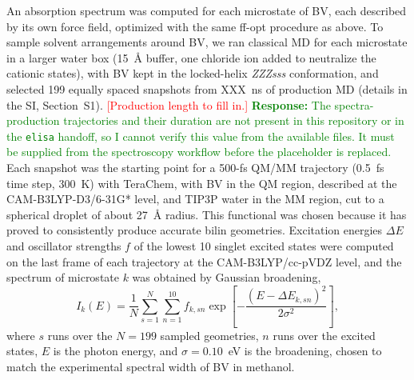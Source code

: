 An absorption spectrum was computed for each microstate of BV, each described by its own force field, optimized with the same ff-opt procedure as above.\cite{curtisRobustAutomatedForce2026}
To sample solvent arrangements around BV, we ran classical MD for each microstate in a larger water box (15~\AA{} buffer, one chloride ion added to neutralize the cationic states), with BV kept in the locked-helix \textit{ZZZsss} conformation,\cite{tongManyRoadsSeam2026} and selected 199 equally spaced snapshots from XXX~ns of production MD (details in the SI, Section~S1). \textcolor{red}{[Production length to fill in.]}
\textcolor{green}{\textbf{Response:} The spectra-production trajectories and their duration are not present in this repository or in the \texttt{elisa} handoff, so I cannot verify this value from the available files. It must be supplied from the spectroscopy workflow before the placeholder is replaced.}
Each snapshot was the starting point for a 500-fs QM/MM trajectory (0.5~fs time step, 300~K) with TeraChem,\cite{ufimtsevQuantumChemistryGraphical2008,ufimtsevQuantumChemistryGraphical2009,ufimtsevQuantumChemistryGraphical2009a} with BV in the QM region, described at the CAM-B3LYP\cite{yanai_new_2004}-D3\cite{grimme_consistent_2010}/6-31G* level, and TIP3P water in the MM region, cut to a spherical droplet of about 27~\AA{} radius.
This functional was chosen because it has proved to consistently produce accurate bilin geometries.\cite{wiebeler_qmmm_2019}
Excitation energies $\Delta E$ and oscillator strengths $f$ of the lowest 10 singlet excited states were computed on the last frame of each trajectory at the CAM-B3LYP/cc-pVDZ level,\cite{wiebeler_qmmm_2019} and the spectrum of microstate $k$ was obtained by Gaussian broadening,
\begin{equation}
I_k(E)
=
\frac{1}{N}
\sum_{s=1}^{N}
\sum_{n=1}^{10}
f_{k,sn}
\exp\left[
-\frac{\left(E-\Delta E_{k,sn}\right)^2}{2\sigma^2}
\right],
\label{eq:microstate-spectrum}
\end{equation}
where $s$ runs over the $N=199$ sampled geometries, $n$ runs over the excited states, $E$ is the photon energy, and $\sigma=0.10$~eV is the broadening, chosen to match the experimental spectral width of BV in methanol.\cite{liuUltrafastSpectroscopyBiliverdin2020}

